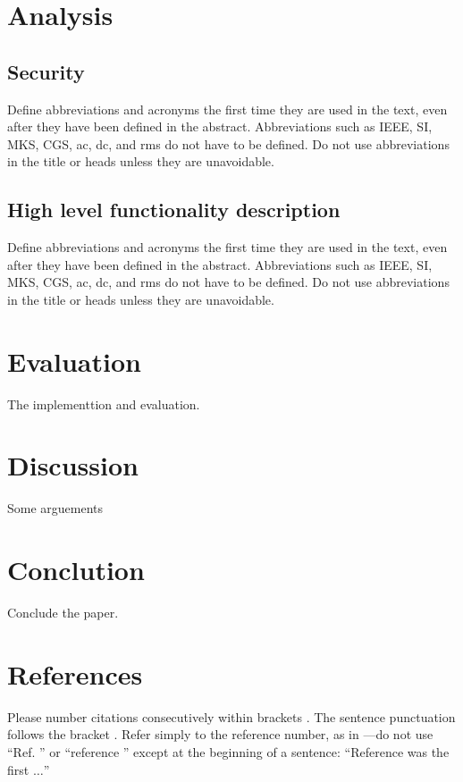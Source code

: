 \documentclass[conference]{IEEEtran}
\begin{document}
\section{Analysis}

\subsection{Security}

Define abbreviations and acronyms the first time they are used in the text, 
even after they have been defined in the abstract. Abbreviations such as 
IEEE, SI, MKS, CGS, ac, dc, and rms do not have to be defined. Do not use 
abbreviations in the title or heads unless they are unavoidable.

\subsection{High level functionality description}

Define abbreviations and acronyms the first time they are used in the text, 
even after they have been defined in the abstract. Abbreviations such as 
IEEE, SI, MKS, CGS, ac, dc, and rms do not have to be defined. Do not use 
abbreviations in the title or heads unless they are unavoidable.

\section{Evaluation}

The implementtion and evaluation.

\section{Discussion}

Some arguements

\section{Conclution}

Conclude the paper.

\section*{References}

Please number citations consecutively within brackets \cite{b1}. The 
sentence punctuation follows the bracket \cite{b2}. Refer simply to the reference 
number, as in \cite{b3}---do not use ``Ref. \cite{b3}'' or ``reference \cite{b3}'' except at 
the beginning of a sentence: ``Reference \cite{b3} was the first $\ldots$''
\end{document}
